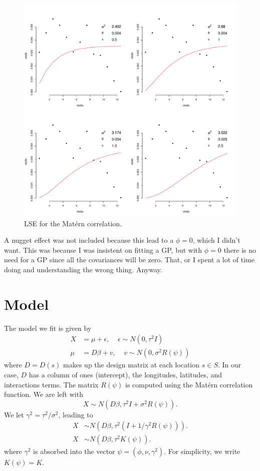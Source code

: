 \documentclass[12pt]{article}
\begin{document}
\begin{figure}[ht]
\begin{center}
\includegraphics[scale=0.30]{figs/matern.pdf}
\end{center}
\caption{LSE for the Mat{\'e}rn correlation.}
\end{figure}

A nugget effect was not included because this lead to a $\phi=0$, which I didn't want. This was because I was insistent on fitting a GP, but with $\phi=0$ there is no need for a GP since all the covariances will be zero. That, or I spent a lot of time doing and understanding the wrong thing. Anyway.

\section{Model}

The model we fit is given by
\begin{align*}
X &= \mu + \epsilon,~~~~~\epsilon\sim N(0,\tau^2 I) \\
\mu &= D\beta + v,~~~~~v \sim N(0, \sigma^2 R(\psi))
\end{align*}
where $D=D(s)$ makes up the design matrix at each location $s\in S$. In our case, $D$ has a column of ones (intercept), the longitudes, latitudes, and interactions terms. The matrix $R(\psi)$ is computed using the Mat{\'e}rn correlation function. We are left with
\[ X \sim N(D\beta, \tau^2 I + \sigma^2 R(\psi)). \]
We let $\gamma^2=\tau^2/\sigma^2$, leading to 
\begin{align*}
X &\sim N(D\beta, \tau^2 (I + 1/\gamma^2 R(\psi))). \\
X &\sim N(D\beta, \tau^2 K(\psi)).
\end{align*}
where $\gamma^2$ is absorbed into the vector $\psi=(\phi, \nu, \gamma^2)$. For simplicity, we write $K(\psi)=K$.
\bigskip
\end{document}
